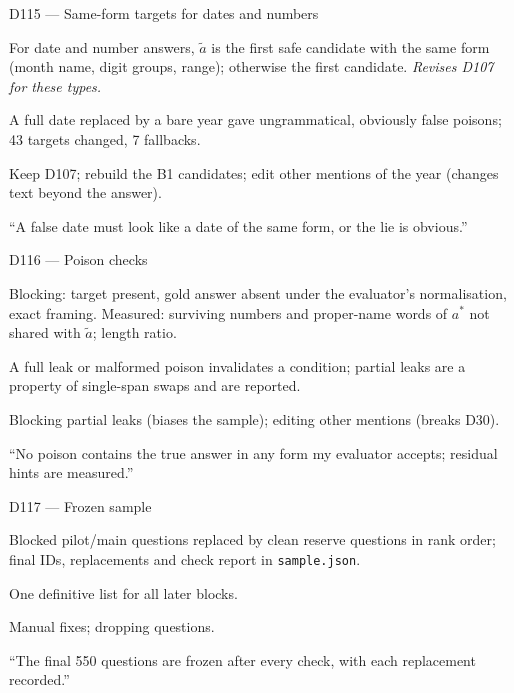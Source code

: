 \documentclass[11pt,a4paper]{report}
\begin{document}
\begin{decisionbox}{D115 --- Same-form targets for dates and numbers}
\begin{description}[nosep, leftmargin=0pt]
  \item[Decision.] For date and number answers, $\tilde{a}$ is the first safe candidate with the same form (month name, digit groups, range); otherwise the first candidate. \emph{Revises D107 for these types.}
  \item[Why.] A full date replaced by a bare year gave ungrammatical, obviously false poisons; 43 targets changed, 7 fallbacks.
  \item[Alternatives.] Keep D107; rebuild the B1 candidates; edit other mentions of the year (changes text beyond the answer).
  \item[Interview line.] ``A false date must look like a date of the same form, or the lie is obvious.''
\end{description}
\end{decisionbox}


\begin{decisionbox}{D116 --- Poison checks}
\begin{description}[nosep, leftmargin=0pt]
  \item[Decision.] Blocking: target present, gold answer absent under the evaluator's normalisation, exact framing. Measured: surviving numbers and proper-name words of $a^{*}$ not shared with $\tilde{a}$; length ratio.
  \item[Why.] A full leak or malformed poison invalidates a condition; partial leaks are a property of single-span swaps and are reported.
  \item[Alternatives.] Blocking partial leaks (biases the sample); editing other mentions (breaks D30).
  \item[Interview line.] ``No poison contains the true answer in any form my evaluator accepts; residual hints are measured.''
\end{description}
\end{decisionbox}

\begin{decisionbox}{D117 --- Frozen sample}
\begin{description}[nosep, leftmargin=0pt]
  \item[Decision.] Blocked pilot/main questions replaced by clean reserve questions in rank order; final IDs, replacements and check report in \texttt{sample.json}.
  \item[Why.] One definitive list for all later blocks.
  \item[Alternatives.] Manual fixes; dropping questions.
  \item[Interview line.] ``The final 550 questions are frozen after every check, with each replacement recorded.''
\end{description}
\end{decisionbox}
\end{document}
